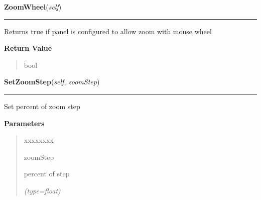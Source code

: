     \label{ImagePanel:ImagePanel:ZoomWheel}

    \vspace{0.5ex}

\hspace{.8\funcindent}\begin{boxedminipage}{\funcwidth}

    \raggedright \textbf{ZoomWheel}(\textit{self})

    \vspace{-1.5ex}

    \rule{\textwidth}{0.5\fboxrule}
\setlength{\parskip}{2ex}
    Returns true if panel is configured to allow zoom with mouse wheel

\setlength{\parskip}{1ex}
      \textbf{Return Value}
    \vspace{-1ex}

      \begin{quote}
      bool

      \end{quote}

    \end{boxedminipage}

    \label{ImagePanel:ImagePanel:SetZoomStep}

    \vspace{0.5ex}

\hspace{.8\funcindent}\begin{boxedminipage}{\funcwidth}

    \raggedright \textbf{SetZoomStep}(\textit{self}, \textit{zoomStep})

    \vspace{-1.5ex}

    \rule{\textwidth}{0.5\fboxrule}
\setlength{\parskip}{2ex}
    Set percent of zoom step

\setlength{\parskip}{1ex}
      \textbf{Parameters}
      \vspace{-1ex}

      \begin{quote}
        \begin{Ventry}{xxxxxxxx}

          \item[zoomStep]

          percent of step

            {\it (type=float)}

        \end{Ventry}

      \end{quote}

    \end{boxedminipage}

